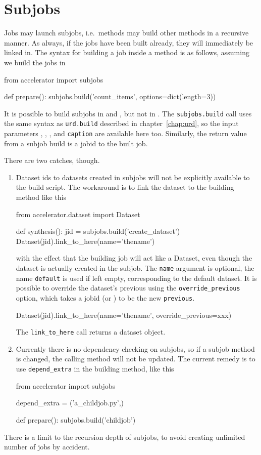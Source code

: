 \section{Subjobs}
\label{sec:subjobs}

Jobs may launch subjobs, i.e.\ methods may build other methods in a
recursive manner.  As always, if the jobs have been built already,
they will immediately be linked in.  The syntax for building a job
inside a method is as follows, assuming we build the jobs in \prepare
\begin{python}
from accelerator import subjobs

def prepare():
    subjobs.build('count_items', options=dict(length=3))
\end{python}
It is possible to build subjobs in \prepare and \synthesis, but not in
\analysis.    The \texttt{subjobs.build} call uses the
same syntax as \texttt{urd.build} described in chapter~\ref{chap:urd}, so
the input parameters \options, \datasets, \jobids, and
\texttt{caption} are available here too.  Similarly, the return value
from a subjob build is a jobid to the built job.

There are two catches, though.
\begin{enumerate}
  \item
Dataset ids to datasets created in subjobs will not be explicitly
available to the build script.  The workaround is to link the dataset
to the building method like this 
\begin{python}
from accelerator.dataset import Dataset

def synthesis():
    jid = subjobs.build('create_dataset')
    Dataset(jid).link_to_here(name='thename')
\end{python}
with the effect that the building job will act like a Dataset, even
though the dataset is actually created in the subjob.  The
\texttt{name} argument is optional, the name \texttt{default} is used
if left empty, corresponding to the default dataset.  It is possible
to override the dataset's previous using
the \texttt{override\_previous} option, which takes a jobid
(or \pyNone) to be the new \texttt{previous}.
\begin{python}
Dataset(jid).link_to_here(name='thename', override_previous=xxx)
\end{python}
The \texttt{link\_to\_here} call returns a dataset object.

\item
Currently there is no dependency checking on subjobs, so if a subjob
method is changed, the calling method will not be updated.  The
current remedy is to use \texttt{depend\_extra} in the building
method, like this
\begin{python}
from accelerator import subjobs

depend_extra = ('a_childjob.py',)

def prepare():
    subjobs.build('childjob')
\end{python}
\end{enumerate}
There is a limit to the recursion depth of subjobs, to avoid creating
unlimited number of jobs by accident.




